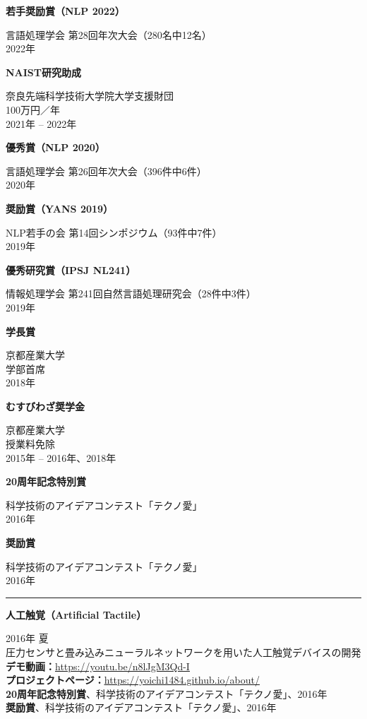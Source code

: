\documentclass[11pt,a4paper]{article}
\let\oldhref\href
\renewcommand{\href}[2]{\oldhref{#1}{\uline{#2}}}
\renewcommand{\url}[1]{\oldhref{#1}{\uline{#1}}}
\newlength{\labelcol}\setlength{\labelcol}{1.2in}
\newlength{\labelgap}\setlength{\labelgap}{0.21in}
\newcommand{\cvsection}[1]{%
  \par\vspace{26pt}%
  {\noindent\rule{\textwidth}{2.4pt}\par}\nopagebreak\vspace{9pt}%
  \noindent\llap{\smash[b]{\parbox[t]{\labelcol}{\raggedright\large\bfseries #1}}\hspace{\labelgap}}\ignorespaces}
\newcommand{\entry}[1]{\par\vspace{10pt}\noindent\textbf{#1}\par\nopagebreak}
\newcommand{\entryfirst}[1]{\textbf{#1}\par\nopagebreak}
\newenvironment{indented}{%
  \par\nopagebreak
  \begin{list}{}{\setlength{\leftmargin}{0.3in}\setlength{\topsep}{1pt}%
    \setlength{\partopsep}{0pt}\setlength{\itemsep}{0pt}\setlength{\parsep}{1pt}}\item[]}{\end{list}}
\newcommand{\awardline}[1]{{\par\raggedleft #1\par}}
\begin{document}
\entry{若手奨励賞（NLP 2022）}
\awardline{言語処理学会 第28回年次大会（280名中12名）\\ 2022年}

\entry{NAIST研究助成}
\awardline{奈良先端科学技術大学院大学支援財団\\ 100万円／年\\ 2021年 -- 2022年}

\entry{優秀賞（NLP 2020）}
\awardline{言語処理学会 第26回年次大会（396件中6件）\\ 2020年}

\entry{奨励賞（YANS 2019）}
\awardline{NLP若手の会 第14回シンポジウム（93件中7件）\\ 2019年}

\entry{優秀研究賞（IPSJ NL241）}
\awardline{情報処理学会 第241回自然言語処理研究会（28件中3件）\\ 2019年}

\entry{学長賞}
\awardline{京都産業大学\\ 学部首席\\ 2018年}

\entry{むすびわざ奨学金}
\awardline{京都産業大学\\ 授業料免除\\ 2015年 -- 2016年、2018年}

\entry{20周年記念特別賞}
\awardline{科学技術のアイデアコンテスト「テクノ愛」\\ 2016年}

\entry{奨励賞}
\awardline{科学技術のアイデアコンテスト「テクノ愛」\\ 2016年}

\cvsection{研究プロジェクト}%
\entryfirst{人工触覚（Artificial Tactile）}
\begin{indented}
2016年 夏\\[3pt]
圧力センサと畳み込みニューラルネットワークを用いた人工触覚デバイスの開発\\
\textbf{デモ動画：}\url{https://youtu.be/n8lJgM3Qd-I}\\[3pt]
\textbf{プロジェクトページ：}\url{https://yoichi1484.github.io/about/}\\[3pt]
\textbf{20周年記念特別賞}、科学技術のアイデアコンテスト「テクノ愛」、2016年\\[3pt]
\textbf{奨励賞}、科学技術のアイデアコンテスト「テクノ愛」、2016年
\end{indented}
\end{document}
